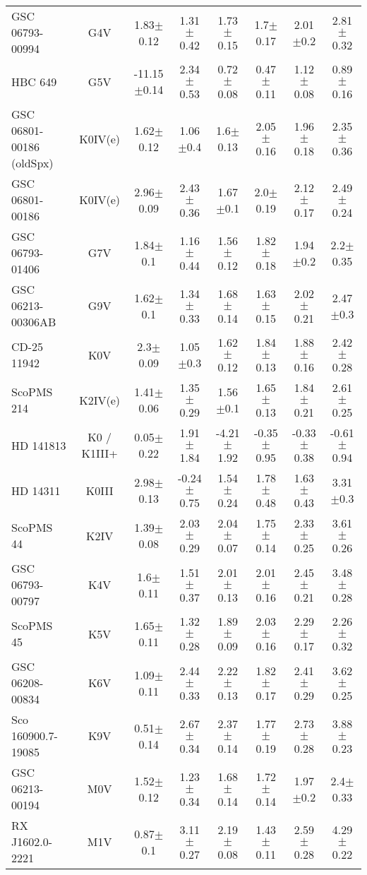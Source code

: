 \begin{table}
\begin{center}
\begin{tabular}{l|c|c|c|c|c|c|c}
GSC 06793-00994 & G4V & 1.83$\pm$0.12 & 1.31$\pm$0.42 & 1.73$\pm$0.15 & 1.7$\pm$0.17 & 2.01$\pm$0.2 & 2.81$\pm$0.32 \\
HBC 649 & G5V & -11.15$\pm$0.14 & 2.34$\pm$0.53 & 0.72$\pm$0.08 & 0.47$\pm$0.11 & 1.12$\pm$0.08 & 0.89$\pm$0.16 \\
GSC 06801-00186 (oldSpx) & K0IV(e) & 1.62$\pm$0.12 & 1.06$\pm$0.4 & 1.6$\pm$0.13 & 2.05$\pm$0.16 & 1.96$\pm$0.18 & 2.35$\pm$0.36 \\
GSC 06801-00186 & K0IV(e) & 2.96$\pm$0.09 & 2.43$\pm$0.36 & 1.67$\pm$0.1 & 2.0$\pm$0.19 & 2.12$\pm$0.17 & 2.49$\pm$0.24 \\
GSC 06793-01406 & G7V & 1.84$\pm$0.1 & 1.16$\pm$0.44 & 1.56$\pm$0.12 & 1.82$\pm$0.18 & 1.94$\pm$0.2 & 2.2$\pm$0.35 \\
GSC 06213-00306AB & G9V & 1.62$\pm$0.1 & 1.34$\pm$0.33 & 1.68$\pm$0.14 & 1.63$\pm$0.15 & 2.02$\pm$0.21 & 2.47$\pm$0.3 \\
CD-25 11942 & K0V & 2.3$\pm$0.09 & 1.05$\pm$0.3 & 1.62$\pm$0.12 & 1.84$\pm$0.13 & 1.88$\pm$0.16 & 2.42$\pm$0.28 \\
ScoPMS 214 & K2IV(e) & 1.41$\pm$0.06 & 1.35$\pm$0.29 & 1.56$\pm$0.1 & 1.65$\pm$0.13 & 1.84$\pm$0.21 & 2.61$\pm$0.25 \\
HD 141813 & K0 / K1III+ & 0.05$\pm$0.22 & 1.91$\pm$1.84 & -4.21$\pm$1.92 & -0.35$\pm$0.95 & -0.33$\pm$0.38 & -0.61$\pm$0.94 \\
HD 14311 & K0III & 2.98$\pm$0.13 & -0.24$\pm$0.75 & 1.54$\pm$0.24 & 1.78$\pm$0.48 & 1.63$\pm$0.43 & 3.31$\pm$0.3 \\
ScoPMS 44 & K2IV & 1.39$\pm$0.08 & 2.03$\pm$0.29 & 2.04$\pm$0.07 & 1.75$\pm$0.14 & 2.33$\pm$0.25 & 3.61$\pm$0.26 \\
GSC 06793-00797 & K4V & 1.6$\pm$0.11 & 1.51$\pm$0.37 & 2.01$\pm$0.13 & 2.01$\pm$0.16 & 2.45$\pm$0.21 & 3.48$\pm$0.28 \\
ScoPMS 45 & K5V & 1.65$\pm$0.11 & 1.32$\pm$0.28 & 1.89$\pm$0.09 & 2.03$\pm$0.16 & 2.29$\pm$0.17 & 2.26$\pm$0.32 \\
GSC 06208-00834 & K6V & 1.09$\pm$0.11 & 2.44$\pm$0.33 & 2.22$\pm$0.13 & 1.82$\pm$0.17 & 2.41$\pm$0.29 & 3.62$\pm$0.25 \\
Sco 160900.7-19085 & K9V & 0.51$\pm$0.14 & 2.67$\pm$0.34 & 2.37$\pm$0.14 & 1.77$\pm$0.19 & 2.73$\pm$0.28 & 3.88$\pm$0.23 \\
GSC 06213-00194 & M0V & 1.52$\pm$0.12 & 1.23$\pm$0.34 & 1.68$\pm$0.14 & 1.72$\pm$0.14 & 1.97$\pm$0.2 & 2.4$\pm$0.33 \\
RX J1602.0-2221 & M1V & 0.87$\pm$0.1 & 3.11$\pm$0.27 & 2.19$\pm$0.08 & 1.43$\pm$0.11 & 2.59$\pm$0.28 & 4.29$\pm$0.22 \\

\end{tabular}
\end{center}
\end{table}
